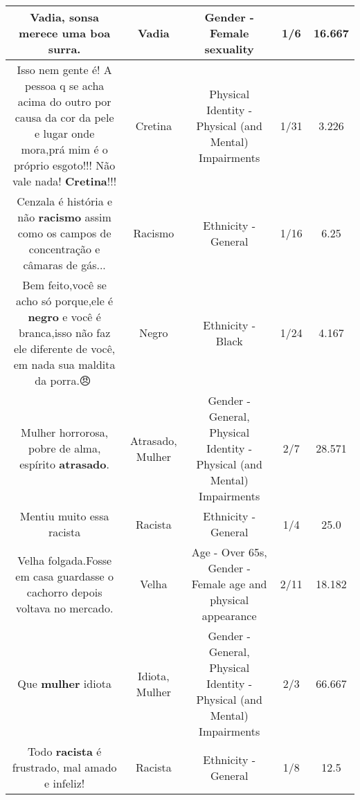 \documentclass[11pt]{article}
\newlength\mylength
\begin{document}
\begin{center}
\begin{longtable}{|C{.65\mylength}|C{.30\mylength}|C{.12\mylength}|C{.12\mylength}|C{.12\mylength}|}
  \small Vadia, sonsa merece uma boa surra.\normalsize   & Vadia & Gender - Female sexuality & 1/6 & 16.667 \\  \hline
  \small Isso nem gente é!  A pessoa q se acha acima do outro por causa da cor da pele e lugar onde mora,prá mim é o próprio esgoto!!! Não vale nada! \textbf{Cretina}!!!\normalsize   & Cretina & Physical Identity - Physical (and Mental) Impairments & 1/31 & 3.226 \\  \hline
  \small Cenzala é história e não \textbf{racismo} assim como os campos de concentração e câmaras de gás...\normalsize   & Racismo & Ethnicity - General & 1/16 & 6.25 \\  \hline
  \small Bem feito,você se acho só porque,ele é \textbf{negro} e você é branca,isso não faz ele diferente de você, em nada sua maldita da porra.😠🖕\normalsize   & Negro & Ethnicity - Black & 1/24 & 4.167 \\  \hline
  \small Mulher horrorosa, pobre de alma, espírito \textbf{atrasado}.\normalsize   & Atrasado, Mulher & Gender - General, Physical Identity - Physical (and Mental) Impairments & 2/7 & 28.571 \\  \hline
  \small Mentiu muito essa racista\normalsize   & Racista & Ethnicity - General & 1/4 & 25.0 \\  \hline
  \small Velha folgada.Fosse em casa guardasse o cachorro depois voltava no mercado.\normalsize   & Velha & Age - Over 65s, Gender - Female age and physical appearance & 2/11 & 18.182 \\  \hline
  \small Que \textbf{mulher} idiota\normalsize   & Idiota, Mulher & Gender - General, Physical Identity - Physical (and Mental) Impairments & 2/3 & 66.667 \\  \hline
  \small Todo \textbf{racista} é frustrado, mal amado e infeliz!\normalsize   & Racista & Ethnicity - General & 1/8 & 12.5 \\  \hline

\end{longtable}
\end{center}
\end{document}
